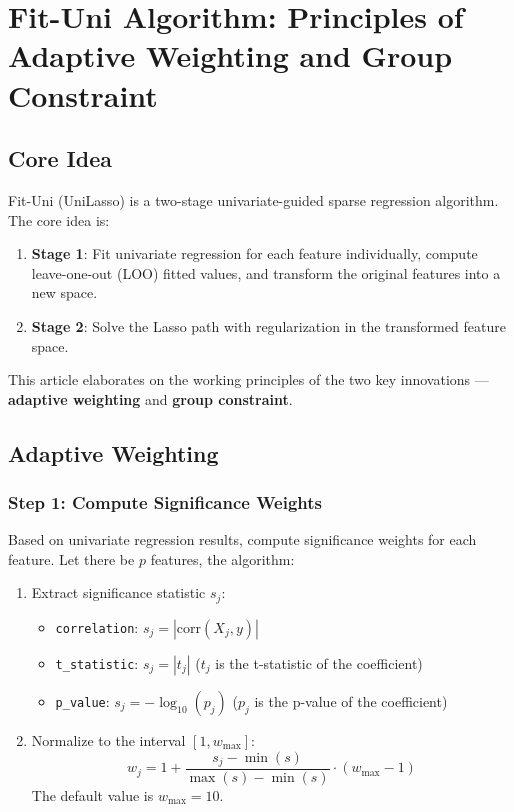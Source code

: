 \documentclass{article}
\begin{document}
\section{Fit-Uni Algorithm: Principles of Adaptive Weighting and Group Constraint}

\subsection{Core Idea}

Fit-Uni (UniLasso) is a two-stage univariate-guided sparse regression algorithm. The core idea is:
\begin{enumerate}
\item \textbf{Stage 1}: Fit univariate regression for each feature individually, compute leave-one-out (LOO) fitted values, and transform the original features into a new space.
\item \textbf{Stage 2}: Solve the Lasso path with regularization in the transformed feature space.
\end{enumerate}

This article elaborates on the working principles of the two key innovations --- \textbf{adaptive weighting} and \textbf{group constraint}.

\subsection{Adaptive Weighting}

\subsubsection{Step 1: Compute Significance Weights}

Based on univariate regression results, compute significance weights for each feature. Let there be $p$ features, the algorithm:

\begin{enumerate}
\item Extract significance statistic $s_j$:
\begin{itemize}
\item \texttt{correlation}: $s_j = |\mathrm{corr}(X_j, y)|$
\item \texttt{t\_statistic}: $s_j = |t_j|$ ($t_j$ is the t-statistic of the coefficient)
\item \texttt{p\_value}: $s_j = -\log_{10}(p_j)$ ($p_j$ is the p-value of the coefficient)
\end{itemize}

\item Normalize to the interval $[1, w_{\text{max}}]$:
\[
\boxed{
w_j = 1 + \frac{s_j - \min(s)}{\max(s) - \min(s)} \cdot (w_{\text{max}} - 1)
}
\]
The default value is $w_{\text{max}} = 10$.
\end{enumerate}
\end{document}
